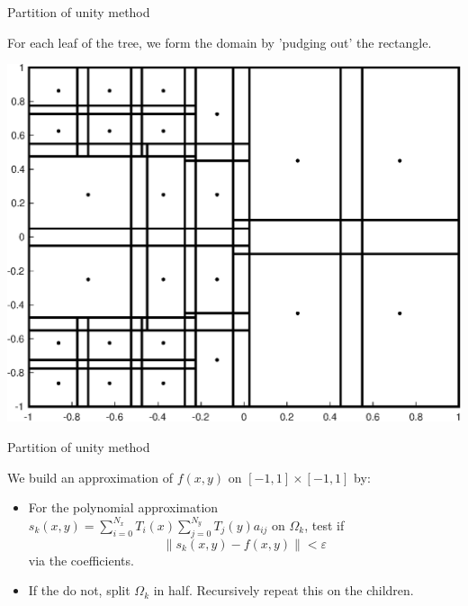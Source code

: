 \documentclass{beamer}
\begin{document}
\begin{frame}{Partition of unity method}

For each leaf of the tree, we form the domain by 'pudging out' the rectangle.
\bigskip

\begin{center}
\includegraphics[scale = 0.4]{domainPlot.eps}
\end{center}
\end{frame}

\begin{frame}{Partition of unity method}

We build an approximation of $f(x,y)$ on $[-1,1] \times [-1,1]$ by:
\bigskip
\begin{itemize}
\item For the polynomial approximation $s_k(x,y)=\sum_{i=0}^{N_x} T_i(x) \sum_{j=0}^{N_y} T_j(y)a_{ij}$ on $\Omega_k$, test if 
$$\|s_k(x,y) - f(x,y) \| < \varepsilon $$
via the coefficients.
\item If the do not, split $\Omega_k$ in half. Recursively repeat this on the children.
\end{itemize}

\end{frame}
\end{document}
